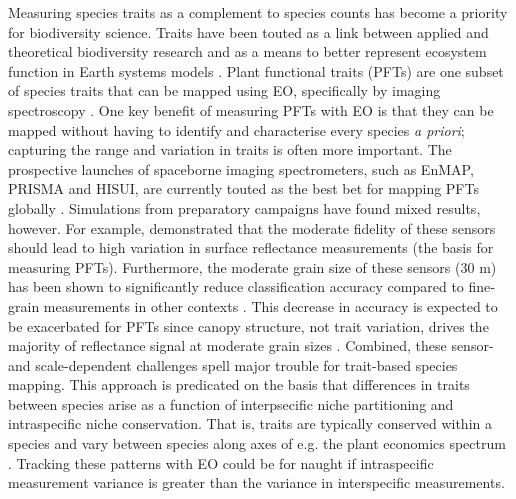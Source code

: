 Measuring species traits as a complement to species counts has become a priority for biodiversity science. Traits have been touted as a link between applied and theoretical biodiversity research and as a means to better represent ecosystem function in Earth systems models \cite{Shipley2006-lt,Jetz2016-bx,Funk2017-io}. Plant functional traits (PFTs) are one subset of species traits that can be mapped using EO, specifically by imaging spectroscopy \cite{Kokaly2009-xk}. One key benefit of measuring PFTs with EO is that they can be mapped without having to identify and characterise every species \textit{a priori}; capturing the range and variation in traits is often more important. The prospective launches of spaceborne imaging spectrometers, such as EnMAP, PRISMA and HISUI, are currently touted as the best bet for mapping PFTs globally \cite{Stuffler2007-ie, Galeazzi2008-lc, Matsunaga2011-ba}. Simulations from preparatory campaigns have found mixed results, however. For example, \cite{Bachmann2015-tt} demonstrated that the moderate fidelity of these sensors should lead to high variation in surface reflectance measurements (the basis for measuring PFTs). Furthermore, the moderate grain size of these sensors (30 m) has been shown to significantly reduce classification accuracy compared to fine‐grain measurements in other contexts \cite{Kruse2011-ck}. This decrease in accuracy is expected to be exacerbated for PFTs since canopy structure, not trait variation, drives the majority of reflectance signal at moderate grain sizes \cite{Yao2015-dp}. Combined, these sensor- and scale-dependent challenges spell major trouble for trait-based species mapping. This approach is predicated on the basis that differences in traits between species arise as a function of interpsecific niche partitioning and intraspecific niche conservation. That is, traits are typically conserved within a species and vary between species along axes of e.g. the plant economics spectrum \cite{Wright2004-md}. Tracking these patterns with EO could be for naught if intraspecific measurement variance is greater than the variance in interspecific measurements.

